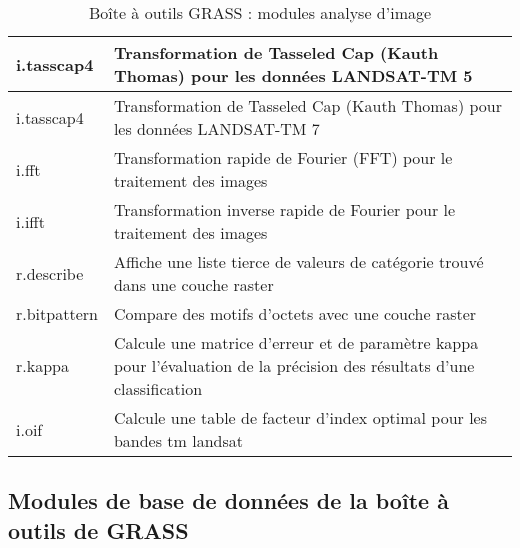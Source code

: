 \begin{table}[H]
\begin{tabular}{|p{4cm}|p{10cm}|}
  \hline i.tasscap4 & Transformation de Tasseled Cap (Kauth Thomas) pour les données LANDSAT-TM 5 \\
  \hline i.tasscap4 & Transformation de Tasseled Cap (Kauth Thomas) pour les données LANDSAT-TM 7 \\
  \hline i.fft & Transformation rapide de Fourier (FFT) pour le traitement des images \\
  \hline i.ifft & Transformation inverse rapide de Fourier pour le traitement des images \\
  \hline r.describe & Affiche une liste tierce de valeurs de catégorie trouvé dans une couche raster\\
  \hline r.bitpattern & Compare des motifs d'octets avec une couche raster\\
  \hline r.kappa & Calcule une matrice d'erreur et de paramètre kappa pour l'évaluation de la précision des résultats d'une classification \\
  \hline i.oif & Calcule une table de facteur d'index optimal pour les bandes tm landsat \\
\hline
\end{tabular}
\caption{Boîte à outils GRASS : modules analyse d'image}
\end{table}

\subsection{Modules de base de données de la boîte à outils de GRASS}

